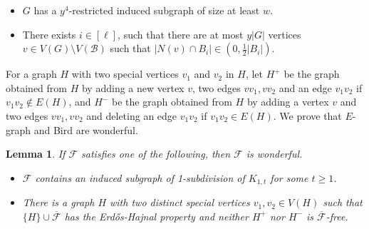 \documentclass[a4paper,11pt]{article}
\newtheorem{lemma}[theorem]{Lemma}
\begin{document}
\begin{itemize}
    \item $G$ has a $y^{4}$-restricted induced subgraph of size at least $w$. 
    \item There exists $i\in[\ell]$, such that there are at most $y|G|$ vertices $v\in V(G)\setminus V(\mathcal{B})$ such that $|N(v)\cap B_i|\in(0,\frac{1}{2}|B_i|)$.
\end{itemize}

For a graph $H$ with two special vertices $v_1$ and $v_2$ in $H$, let $H^+$ be the graph obtained from $H$ by adding a new vertex $v$, two edges $vv_1,vv_2$ and an edge $v_1v_2$ if $v_1v_2\notin E(H)$, and $H^-$ be the graph obtained from $H$ by adding a vertex $v$ and two edges $vv_1,vv_2$ and deleting an edge $v_1v_2$ if $v_1v_2\in E(H)$. We prove that $E$-graph and Bird are wonderful.
    
\begin{lemma}\label{lem:wonderful}
    If $\mathcal{F}$ satisfies one of the following, then $\mathcal{F}$ is wonderful. 
    \begin{itemize}
       
        \item[$(1)$] $\mathcal{F}$ contains an induced subgraph of 1-subdivision of $K_{1,t}$ for some $t\geq 1$. 
        
        \item[$(2)$] There is a graph $H$ with two distinct special vertices $v_1,v_2\in V(H)$ such that $\{H\}\cup \overline{\mathcal{F}}$ has the Erd\H{o}s-Hajnal property and neither $H^+$ nor $H^-$ is $\overline{\mathcal{F}}$-free.
           
    \end{itemize}
        
\end{lemma}
\end{document}
